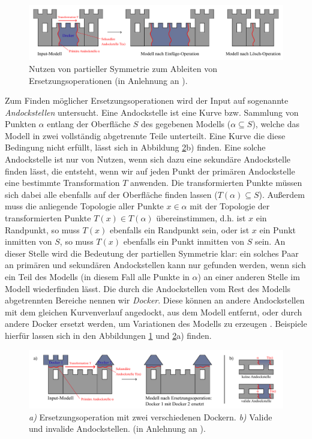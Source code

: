 \begin{figure}[t]
    \centering
    \includegraphics[width=\imgWidth]{images/partial_symmetry.pdf}
    \caption{Nutzen von partieller Symmetrie zum Ableiten von Ersetzungsoperationen (in Anlehnung an \cite{3_bokeloh_et_al}).}
    \label{fig:partial_symmetry}
\end{figure}

Zum Finden möglicher Ersetzungsoperationen wird der Input auf sogenannte \textit{Andockstellen} untersucht. Eine Andockstelle ist eine Kurve bzw.
Sammlung von Punkten \(\alpha\) entlang der Oberfläche \(S\) des gegebenen Modells (\(\alpha \subseteq S\)), welche das Modell in zwei vollständig
abgetrennte Teile unterteilt. Eine Kurve die diese Bedingung nicht erfüllt, lässt sich in Abbildung \ref{fig:partial_symmetry_2}b) finden. Eine solche Andockstelle ist
nur von Nutzen, wenn sich dazu eine sekundäre Andockstelle finden lässt, die entsteht, wenn wir auf jeden Punkt der primären Andockstelle eine
bestimmte Transformation \(T\) anwenden. Die transformierten Punkte müssen sich dabei alle ebenfalls auf der Oberfläche finden lassen
(\(T(\alpha) \subseteq S\)). Außerdem muss die anliegende Topologie aller Punkte \(x \in \alpha\) mit der Topologie der transformierten Punkte
\(T(x) \in T(\alpha)\) übereinstimmen, d.h. ist \(x\) ein Randpunkt, so muss \(T(x)\) ebenfalls ein Randpunkt sein, oder ist \(x\) ein Punkt
inmitten von \(S\), so muss \(T(x)\) ebenfalls ein Punkt inmitten von \(S\) sein. An dieser Stelle wird die Bedeutung der partiellen Symmetrie klar:
ein solches Paar an primären und sekundären Andockstellen kann nur gefunden werden, wenn sich ein Teil des Modells (in diesem Fall alle Punkte in
\(\alpha\)) an einer anderen Stelle im Modell wiederfinden lässt. Die durch die Andockstellen vom Rest des Modells abgetrennten Bereiche nennen wir
\textit{Docker}. Diese können an andere Andockstellen mit dem gleichen Kurvenverlauf angedockt, aus dem Modell entfernt, oder durch
andere Docker ersetzt werden, um Variationen des Modells zu erzeugen \cite{3_bokeloh_et_al}. Beispiele hierfür lassen sich in den Abbildungen
\ref{fig:partial_symmetry} und \ref{fig:partial_symmetry_2}a) finden.

\begin{figure}[t]
    \centering
    \includegraphics[width=\imgWidth]{images/partial_symmetry_2.pdf}
    \caption{\textit{a)} Ersetzungsoperation mit zwei verschiedenen Dockern. \textit{b)} Valide und invalide Andockstellen. (in Anlehnung an \cite{3_bokeloh_et_al}).}
    \label{fig:partial_symmetry_2}
\end{figure}
